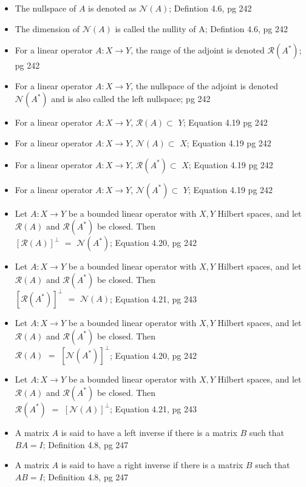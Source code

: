 \documentclass{article}
\begin{document}
\begin{multicols}{2}
\begin{itemize}
\item The nullspace of $A$ is denoted as $\mathcal{N}(A)$; Defintion 4.6, pg 242
\item The dimension of $\mathcal{N}(A)$ is called the nullity of A; Defintion 4.6, pg 242
\item For a linear operator $A: X \to Y$, the range of the adjoint is denoted $\mathcal{R} (A^*)$; pg 242
\item For a linear operator $A: X \to Y$, the nullspace of the adjoint is denoted $\mathcal{N} (A^*)$ and is also called the left nullspace; pg 242
\item For a linear operator $A: X \to Y$, $\mathcal{R}(A) \subset $ $Y$; Equation 4.19 pg 242
\item For a linear operator $A: X \to Y$, $\mathcal{N}(A) \subset $ $X$; Equation 4.19 pg 242
\item For a linear operator $A: X \to Y$, $\mathcal{R}(A^*) \subset $ $X$; Equation 4.19 pg 242
\item For a linear operator $A: X \to Y$, $\mathcal{N}(A^*) \subset $ $Y$; Equation 4.19 pg 242
\item Let $A: X \to Y$ be a bounded linear operator with $X,Y$ Hilbert spaces, and let $\mathcal{R}(A)$ and $\mathcal{R}(A^*)$ be closed. Then \\
$ [ \mathcal{R}(A)]^\bot $  $=$ $ \mathcal{N}(A^*)$; Equation 4.20, pg 242
\item Let $A: X \to Y$ be a bounded linear operator with $X,Y$ Hilbert spaces, and let $\mathcal{R}(A)$ and $\mathcal{R}(A^*)$ be closed. Then \\
$ [ \mathcal{R}(A^*)]^\bot $  $=$ $ \mathcal{N}(A)$; Equation 4.21, pg 243
\item Let $A: X \to Y$ be a bounded linear operator with $X,Y$ Hilbert spaces, and let $\mathcal{R}(A)$ and $\mathcal{R}(A^*)$ be closed. Then \\
$ \mathcal{R}(A)$  $=$ $ [\mathcal{N}(A^*)]^\bot$; Equation 4.20, pg 242
\item Let $A: X \to Y$ be a bounded linear operator with $X,Y$ Hilbert spaces, and let $\mathcal{R}(A)$ and $\mathcal{R}(A^*)$ be closed. Then \\
$ \mathcal{R}(A^*) $  $=$ $ [\mathcal{N}(A)]^\bot $; Equation 4.21, pg 243
\item A matrix $A$ is said to have a left inverse if there is a matrix $B$ such that $BA = I$; Definition 4.8, pg 247
\item A matrix $A$ is said to have a right inverse if there is a matrix $B$ such that $AB = I$; Definition 4.8, pg 247

\end{itemize}
\end{multicols}
\end{document}
